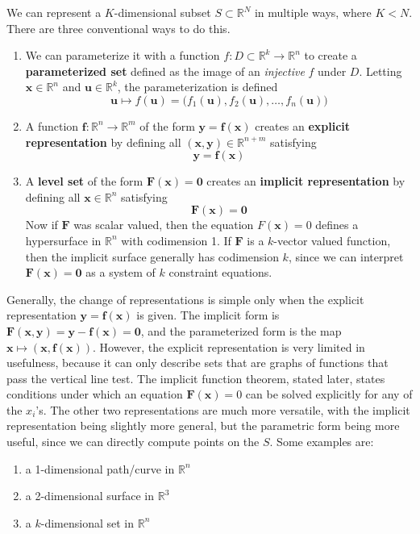 \documentclass{article}
\theoremstyle{remark}
\theoremstyle{definition}
\begin{document}
We can represent a $K$-dimensional subset $S \subset \mathbb{R}^N$ in multiple ways, where $K < N$. There are three conventional ways to do this. 
\begin{enumerate}
    \item We can parameterize it with a function $f: D \subset \mathbb{R}^k \longrightarrow \mathbb{R}^n$ to create a \textbf{parameterized set} defined as the image of an \textit{injective} $f$ under $D$. Letting $\mathbf{x} \in \mathbb{R}^n$ and $\mathbf{u} \in \mathbb{R}^k$, the parameterization is defined 
    \[\mathbf{u} \mapsto f(\mathbf{u}) = \big( f_1 (\mathbf{u}), f_2 (\mathbf{u}), \ldots, f_n (\mathbf{u}) \big) \]
    
    \item A function $\mathbf{f}: \mathbb{R}^n \longrightarrow \mathbb{R}^m$ of the form $\mathbf{y} = \mathbf{f}(\mathbf{x})$ creates an \textbf{explicit representation} by defining all $(\mathbf{x}, \mathbf{y}) \in \mathbb{R}^{n+m}$ satisfying 
    \[\mathbf{y} = \mathbf{f}(\mathbf{x})\]
    
    \item A \textbf{level set} of the form $\mathbf{F}(\mathbf{x}) = \mathbf{0}$ creates an \textbf{implicit representation} by defining all $\mathbf{x} \in \mathbb{R}^n$ satisfying 
    \[\mathbf{F}(\mathbf{x}) = \mathbf{0}\]
    Now if $\mathbf{F}$ was scalar valued, then the equation $F(\mathbf{x}) = 0$ defines a hypersurface in $\mathbb{R}^n$ with codimension 1. If $\mathbf{F}$ is a $k$-vector valued function, then the implicit surface generally has codimension $k$, since we can interpret $\mathbf{F}(\mathbf{x}) = \mathbf{0}$ as a system of $k$ constraint equations. 
\end{enumerate}
Generally, the change of representations is simple only when the explicit representation $\mathbf{y} = \mathbf{f}(\mathbf{x})$ is given. The implicit form is $\mathbf{F}(\mathbf{x}, \mathbf{y}) = \mathbf{y} - \mathbf{f}(\mathbf{x}) = \mathbf{0}$, and the parameterized form is the map $\mathbf{x} \mapsto (\mathbf{x}, \mathbf{f}(\mathbf{x}))$. However, the explicit representation is very limited in usefulness, because it can only describe sets that are graphs of functions that pass the vertical line test. The implicit function theorem, stated later, states conditions under which an equation $\mathbf{F}(\mathbf{x}) = 0$ can be solved explicitly for any of the $x_i$'s. The other two representations are much more versatile, with the implicit representation being slightly more general, but the parametric form being more useful, since we can directly compute points on the $S$. Some examples are: 
\begin{enumerate}
    \item a 1-dimensional path/curve in $\mathbb{R}^n$ 
    \item a 2-dimensional surface in $\mathbb{R}^3$ 
    \item a $k$-dimensional set in $\mathbb{R}^n$ 
\end{enumerate}
\end{document}
